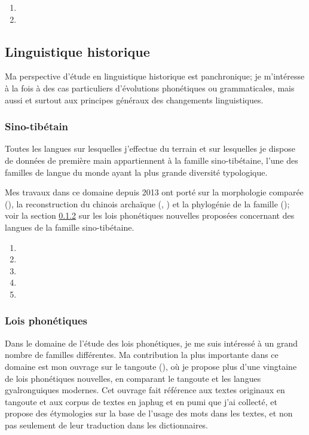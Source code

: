 \documentclass[oldfontcommands,oneside,a4paper,11pt]{article}
\begin{document}
\begin{enumerate}
 \item  {}
  \item  {}
\end{enumerate}

\subsection{Linguistique historique} \label{sec:linghist}
Ma perspective d'étude en linguistique historique est panchronique; je m'intéresse à la fois à des cas particuliers d'évolutions phonétiques ou grammaticales, mais aussi et surtout aux principes généraux des changements linguistiques. 


\subsubsection{Sino-tibétain}
Toutes les langues sur lesquelles j'effectue du terrain et sur lesquelles je dispose de données de première main appartiennent à la famille sino-tibétaine,  l'une des familles de langue du monde ayant la plus grande diversité typologique.

Mes travaux dans ce domaine depuis 2013 ont porté sur la morphologie comparée (\citealt{jacques15causative, jacques16th}), la reconstruction du chinois archaïque (\citealt{jacques16ssuffixes}, \citealt{jacques17buyang}) et la phylogénie de la famille (\citealt{jacques17genetic}); voir la section \ref{sec:lois.phonetiques} sur les lois phonétiques nouvelles proposées  concernant des langues de la famille sino-tibétaine.
 
\begin{enumerate}
 \item {}
 \item {}
 \item {}
 \item {}
  \item {}
\end{enumerate}
 
\subsubsection{Lois phonétiques} \label{sec:lois.phonetiques}
Dans le domaine de l'étude des lois phonétiques, je me suis intéressé à un grand nombre de familles différentes. Ma contribution la plus importante dans ce domaine est mon ouvrage sur le tangoute (\citealt{jacques14esquisse}), où je propose plus d'une vingtaine de lois phonétiques nouvelles, en comparant le tangoute et les langues gyalronguiques modernes. Cet ouvrage fait référence aux textes originaux en tangoute et aux corpus de textes en japhug et en pumi que j'ai collecté, et propose des étymologies sur la base de l'usage des mots dans les textes, et non pas seulement de leur traduction dans les dictionnaires.  
\end{document}
